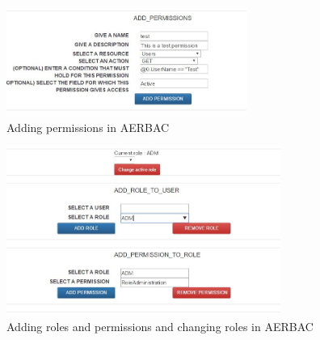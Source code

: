 \begin{figure}[h]
    \centering
    \includegraphics[width=0.7\textwidth, height=0.22\textwidth]{Img/Tool/AddPermission.JPG}
    \caption{Adding permissions in AERBAC}
\end{figure}
\begin{figure}[h]
    \centering
    \includegraphics[width=0.8\textwidth, height=0.45\textwidth]{Img/Tool/RBAC_AddRP.JPG}
    \caption{Adding roles and permissions and changing roles in AERBAC}
\end{figure}

